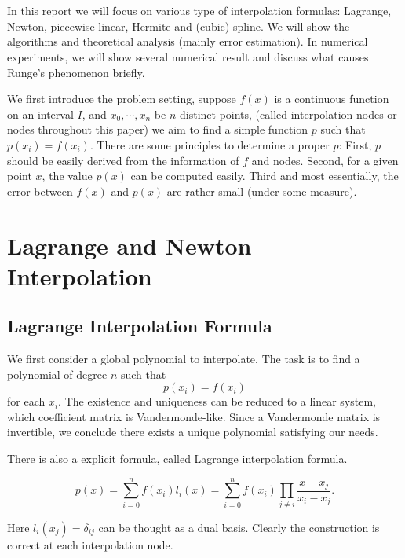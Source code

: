 \documentclass{article}
\begin{document}
	\maketitle
	\thispagestyle{fancy}
	\tableofcontents
	
	\section*{}
In this report we will focus on various type of interpolation formulas: Lagrange, Newton, piecewise linear, Hermite and (cubic) spline. We will show the algorithms and theoretical analysis (mainly error estimation). In numerical experiments, we will show several numerical result and discuss what causes Runge's phenomenon briefly.

We first introduce the problem setting, suppose $f(x)$ is a continuous function on an interval $I$, and $x_0,\cdots, x_n$ be $n$ distinct points, (called interpolation nodes or nodes throughout this paper) we aim to find a simple function $p$ such that $p(x_i) = f(x_i)$. There are some principles to determine a proper $p$: First, $p$ should be easily derived from the information of $f$ and nodes. Second, for a given point $x$, the value $p(x)$ can be computed easily. Third and most essentially, the error between $f(x)$ and $p(x)$ are rather small (under some measure).

\section{Lagrange and Newton Interpolation}
\subsection{Lagrange Interpolation Formula}
We first consider a global polynomial to interpolate. The task is to find a polynomial of degree $n$ such that 
$$p(x_i) = f(x_i)$$ for each $x_i$. The existence and uniqueness can be reduced to a linear system, which coefficient matrix is 
Vandermonde-like. Since a Vandermonde matrix is invertible, we conclude there exists a unique polynomial satisfying our needs. 

There is also a explicit formula, called Lagrange interpolation formula.

$$p(x) = \sum_{i=0}^n f(x_i)l_i(x) = \sum_{i=0}^n f(x_i) \prod_{j\neq i} \frac{x - x_j}{x_i - x_j}.$$

Here $l_i(x_j) = \delta_{ij}$ can be thought as a dual basis. Clearly the construction is correct at each interpolation node. 
\end{document}
